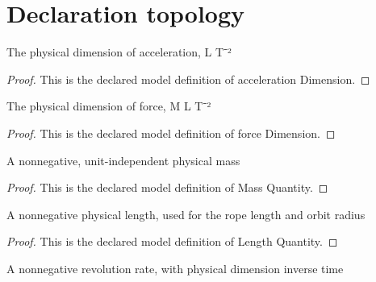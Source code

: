 \section{Declaration topology}
\begin{definition}
  \label{def:physics:phyx-mini-0806:phyxminiproblems-problemphyxmini0806-accelerationdimension}
  The physical dimension of acceleration, L T⁻²
\end{definition}
\begin{proof}
  This is the declared model definition of acceleration Dimension.
\end{proof}
\begin{definition}
  \label{def:physics:phyx-mini-0806:phyxminiproblems-problemphyxmini0806-forcedimension}
  The physical dimension of force, M L T⁻²
\end{definition}
\begin{proof}
  This is the declared model definition of force Dimension.
\end{proof}
\begin{definition}
  \label{def:physics:phyx-mini-0806:phyxminiproblems-problemphyxmini0806-massquantity}
  A nonnegative, unit-independent physical mass
\end{definition}
\begin{proof}
  This is the declared model definition of Mass Quantity.
\end{proof}
\begin{definition}
  \label{def:physics:phyx-mini-0806:phyxminiproblems-problemphyxmini0806-lengthquantity}
  A nonnegative physical length, used for the rope length and orbit radius
\end{definition}
\begin{proof}
  This is the declared model definition of Length Quantity.
\end{proof}
\begin{definition}
  \label{def:physics:phyx-mini-0806:phyxminiproblems-problemphyxmini0806-revolutionratequantity}
  A nonnegative revolution rate, with physical dimension inverse time
\end{definition}
